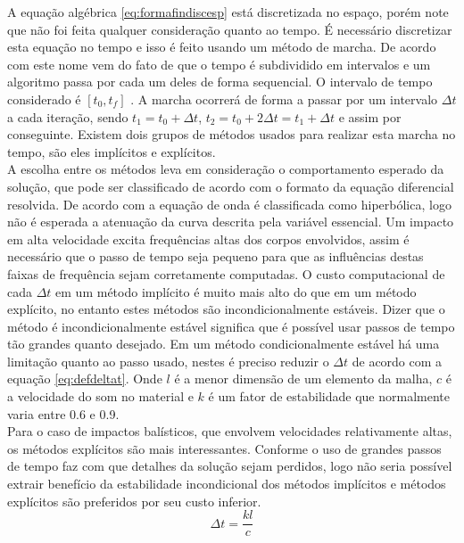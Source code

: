 A equação algébrica \ref{eq:formafindiscesp} está discretizada no espaço, porém note que não foi feita qualquer consideração quanto ao tempo. É necessário discretizar esta equação no tempo e isso é feito usando um método de marcha. De acordo com \cite{Paulo} este nome vem do fato de que o tempo é subdividido em intervalos e um algoritmo passa por cada um deles de forma sequencial. O intervalo de tempo considerado é $[t_0,t_f] $ . A marcha ocorrerá de forma a passar por um intervalo $ \Delta t $ a cada iteração, sendo $ t_1 = t_0 + \Delta t $, $ t_2 = t_0 + 2 \Delta t = t_1 + \Delta t $ e assim por conseguinte. Existem dois grupos de métodos usados para realizar esta marcha no tempo, são eles implícitos e explícitos. \\

A escolha entre os métodos leva em consideração o comportamento esperado da solução, que pode ser classificado de acordo com o formato da equação diferencial resolvida. De acordo com \cite{BangerthHartmannKanschat2007} a equação de onda é classificada como hiperbólica, logo não é esperada a atenuação da curva descrita pela variável essencial. Um impacto em alta velocidade excita frequências altas dos corpos envolvidos, assim é necessário que o passo de tempo seja pequeno para que as influências destas faixas de frequência sejam corretamente computadas. O custo computacional de cada $\Delta t$ em um método implícito é muito mais alto do que em um método explícito, no entanto estes métodos são incondicionalmente estáveis. Dizer que o método é incondicionalmente estável significa que é possível usar passos de tempo tão grandes quanto desejado. Em um método condicionalmente estável há uma limitação quanto ao passo usado, nestes é preciso reduzir o $ \Delta t $ de acordo com a equação \ref{eq:defdeltat}. Onde $l$ é a menor dimensão de um elemento da malha, $c$ é a velocidade do som no material e $k$ é um fator de estabilidade que normalmente varia entre 0.6 e 0.9. \\


Para o caso de impactos balísticos, que envolvem velocidades relativamente altas, os métodos explícitos são mais interessantes. Conforme \cite{Zukas} o uso de grandes passos de tempo faz com que detalhes da solução sejam perdidos, logo não seria possível extrair benefício da estabilidade incondicional dos métodos implícitos e métodos explícitos são preferidos por seu custo inferior. \\

\begin{equation}
\Delta t = \frac{k l }{c}
\label{eq:defdeltat}
\end{equation}

